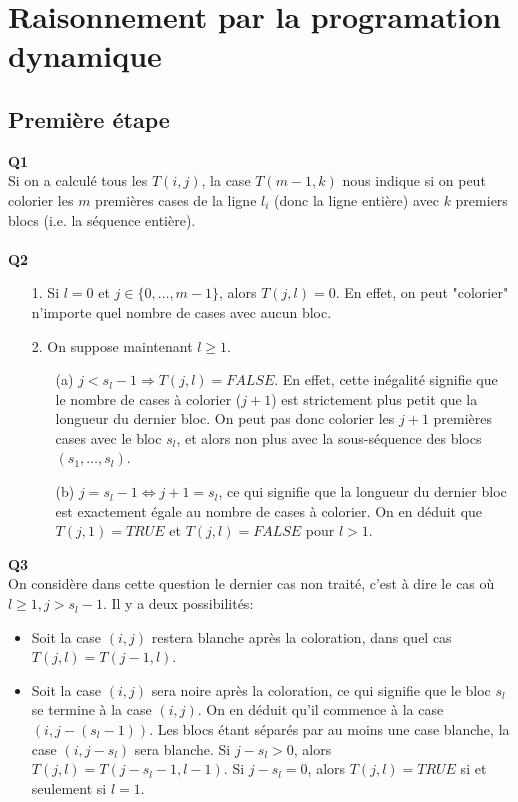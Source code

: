 \documentclass[10pt,a4paper]{article}
\begin{document}
\section{Raisonnement par la programation dynamique}
\subsection{Première étape}
\noindent \textbf{Q1} \\
Si on a calculé tous les $T(i,j)$, la case $T(m-1, k)$ nous indique si on peut colorier les $m$ premières cases de la ligne $l_i$ (donc la ligne entière) avec $k$ premiers blocs (i.e. la séquence entière). \\ \\
\noindent \textbf{Q2}
\begin{itemize}
\item[1.] Si $l = 0$ et $j \in \lbrace 0, \hdots, m-1 \rbrace$, alors $T(j,l) = 0$. En effet, on peut "colorier" n'importe quel nombre de cases avec aucun bloc. \\ 
\item[2.] On suppose maintenant $l \geq 1$.
	\begin{itemize}
		\item[(a)] $j < s_l -1 \Rightarrow T(j,l) = FALSE$. En effet, cette inégalité signifie que le nombre de cases à colorier ($j+1$) est strictement plus petit que la longueur du dernier bloc. On peut pas donc colorier les $j+1$ premières cases avec le bloc $s_l$, et alors non plus avec la sous-séquence des blocs $(s_1, \hdots, s_l)$. 
		\item[(b)] $j = s_l -1 \Leftrightarrow j+1 = s_l$, ce qui signifie que la longueur du dernier bloc est exactement égale au nombre de cases à colorier. On en déduit que $T(j,1) = TRUE$ et $T(j,l) = FALSE$ pour $l > 1$. 
	\end{itemize}
\end{itemize}
\noindent
\textbf{Q3} \\
On considère dans cette question le dernier cas non traité, c'est à dire le cas où $l \geq 1, j > s_l -1$. Il y a deux possibilités: 
\begin{itemize}
	\item Soit la case $(i,j)$ restera blanche après la coloration, dans quel cas $T(j,l) = T(j-1,l)$. 
	\item Soit la case $(i,j)$ sera noire après la coloration, ce qui signifie que le bloc $s_l$ se termine à la case $(i,j)$. On en déduit qu'il commence à la case $(i, j - (s_l -1))$. Les blocs étant séparés par au moins une case blanche, la case $(i, j-s_l)$ sera blanche. Si $j-s_l > 0$, alors $T(j, l) = T(j-s_l -1, l-1)$. Si $j-s_l = 0$, alors $T(j,l) = TRUE$ si et seulement si $l = 1$.  
\end{itemize}  
\end{document}
